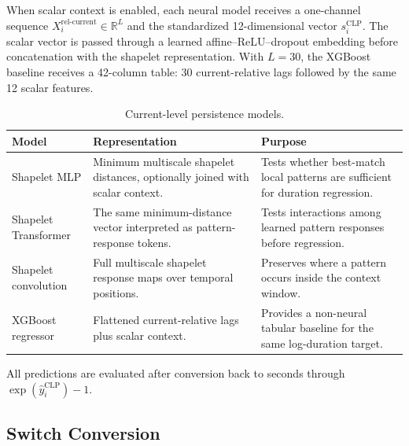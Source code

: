 When scalar context is enabled, each neural model receives a one-channel
sequence
\(X_i^{\text{rel-current}}\in\mathbb{R}^{L}\) and the standardized
12-dimensional vector \(s_i^{\text{CLP}}\). The scalar vector is passed through
a learned affine--ReLU--dropout embedding before concatenation with the
shapelet representation. With \(L=30\), the XGBoost baseline receives a
42-column table: 30 current-relative lags followed by the same 12 scalar
features.

\begin{table}[htbp]
  \centering
  \small
  \caption{Current-level persistence models.}
  \label{tab:current-level-models}
  \renewcommand{\arraystretch}{1.25}
  \setlength{\tabcolsep}{3pt}
  \begin{tabular}{@{}>{\raggedright\arraybackslash}p{}
    >{\raggedright\arraybackslash}p{}
    >{\raggedright\arraybackslash}p{}@{}}
    \toprule
    Model & Representation & Purpose \\
    \midrule
    Shapelet MLP \cite{grabocka2014learning}
      & Minimum multiscale shapelet distances, optionally joined with scalar
        context.
      & Tests whether best-match local patterns are sufficient for duration
        regression. \\
    Shapelet Transformer \cite{grabocka2014learning,vaswani2017attention}
      & The same minimum-distance vector interpreted as pattern-response
        tokens.
      & Tests interactions among learned pattern responses before regression. \\
    Shapelet convolution \cite{grabocka2014learning}
      & Full multiscale shapelet response maps over temporal positions.
      & Preserves where a pattern occurs inside the context window. \\
    XGBoost regressor \cite{chen2016xgboost}
      & Flattened current-relative lags plus scalar context.
      & Provides a non-neural tabular baseline for the same log-duration target. \\
    \bottomrule
  \end{tabular}
\end{table}

All predictions are evaluated after conversion back to seconds through
\(\exp(\widehat{y}_i^{\text{CLP}})-1\).

\subsection{Switch Conversion}

